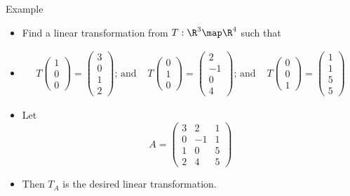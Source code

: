 \documentclass{beamer}
\begin{document}

\beamerdefaultoverlayspecification{<+->}

\begin{frame}{Example}
\begin{itemize}
\item Find a linear transformation from $T:\R^3\map\R^4$ such that
\item
$$
\begin{matrix}
T\begin{pmatrix} 1 \\ 0 \\ 0  \end{pmatrix} = \begin{pmatrix} 3 \\ 0 \\ 1 \\ 2  \end{pmatrix}
\text{; and }
&
T\begin{pmatrix} 0 \\ 1 \\ 0  \end{pmatrix} = \begin{pmatrix} 2 \\ -1 \\ 0 \\ 4  \end{pmatrix}
\text{; and }
&
T \begin{pmatrix} 0 \\ 0 \\ 1  \end{pmatrix} = \begin{pmatrix} 1 \\ 1 \\ 5 \\ 5  \end{pmatrix}
\end{matrix}
$$
\item Let
$$
A =
\begin{pmatrix}
3 & 2 & 1 \\
0 & -1 & 1 \\
1 & 0 & 5 \\
2 & 4 & 5
\end{pmatrix}
$$
\item Then $T_A$ is the desired linear transformation.
\end{itemize}
\end{frame}

\end{document}
